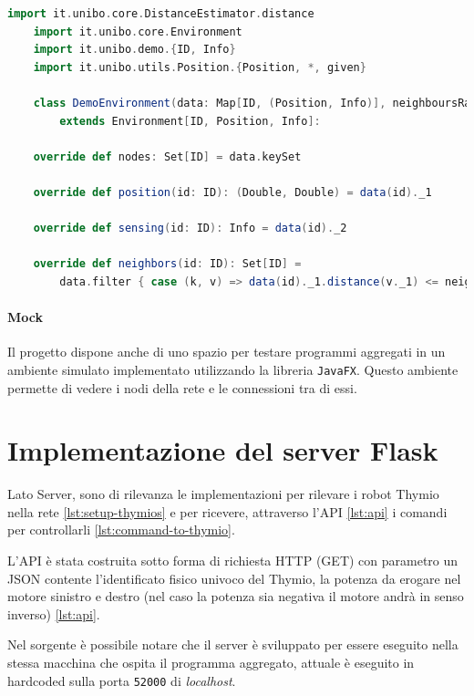 \documentclass[12pt,a4paper,openright,twoside]{book}
\begin{document}
\begin{lstlisting}[language=Scala, label={lst:demo-env}, caption={Definizione dell'ambiente}]
    import it.unibo.core.DistanceEstimator.distance
    import it.unibo.core.Environment
    import it.unibo.demo.{ID, Info}
    import it.unibo.utils.Position.{Position, *, given}

    class DemoEnvironment(data: Map[ID, (Position, Info)], neighboursRadius: Double)
        extends Environment[ID, Position, Info]:

    override def nodes: Set[ID] = data.keySet

    override def position(id: ID): (Double, Double) = data(id)._1

    override def sensing(id: ID): Info = data(id)._2

    override def neighbors(id: ID): Set[ID] =
        data.filter { case (k, v) => data(id)._1.distance(v._1) <= neighboursRadius }.keys.toSet
\end{lstlisting}

\paragraph{Mock}
Il progetto dispone anche di uno spazio per testare programmi aggregati in un ambiente simulato implementato utilizzando la libreria \verb|JavaFX|. Questo ambiente permette di vedere i nodi della rete e le connessioni tra di essi.

\section{Implementazione del server Flask}

Lato Server, sono di rilevanza le implementazioni per rilevare i robot Thymio nella rete \cref{lst:setup-thymios} e per ricevere, attraverso l'API \cref{lst:api} i comandi per controllarli \cref{lst:command-to-thymio}.



L'API è stata costruita sotto forma di richiesta HTTP (GET) con parametro un JSON contente l'identificato fisico univoco del Thymio, la potenza da erogare nel motore sinistro e destro (nel caso la potenza sia negativa il motore andrà in senso inverso) \cref{lst:api}.

Nel sorgente è possibile notare che il server è sviluppato per essere eseguito nella stessa macchina che ospita il programma aggregato, attuale è eseguito in hardcoded sulla porta \verb|52000| di \textit{localhost}.
\end{document}
